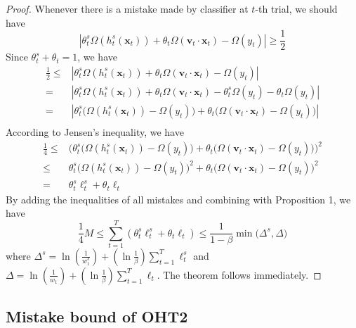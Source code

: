 \documentclass{article} %
\theoremstyle{remark}
\theoremstyle{definition}
\begin{document}
\begin{proof}
Whenever there is a mistake made by classifier at $t$-th trial, we should have 
$$ | \theta_{t}^{s} \varOmega(h_{t}^{s}(\mathbf{x}_t)) + \theta_t \varOmega(\mathbf{v}_t \cdot \mathbf{x}_t) - \varOmega(y_t) | \geq \frac{1}{2} $$
Since $\theta_{t}^{s} + \theta_t = 1$, we have
\begin{equation*}
\begin{split}
\frac{1}{2} \leq 
  & | \theta_{t}^{s} \varOmega(h_{t}^{s}(\mathbf{x}_t)) + \theta_t \varOmega(\mathbf{v}_t \cdot \mathbf{x}_t) - \varOmega(y_t) | \\
= & | \theta_{t}^{s} \varOmega(h_{t}^{s}(\mathbf{x}_t)) + \theta_t \varOmega(\mathbf{v}_t \cdot \mathbf{x}_t) - \theta_{t}^{s} \varOmega(y_t) - \theta_t \varOmega(y_t) | \\
= & | \theta_{t}^{s} \big( \varOmega(h_{t}^{s}(\mathbf{x}_t)) - \varOmega(y_t) \big) + \theta_t \big( \varOmega(\mathbf{v}_t \cdot \mathbf{x}_t) - \varOmega(y_t) \big) | \\
\end{split}
\end{equation*}
According to Jensen's inequality, we have
\begin{equation*}
\begin{split}
\frac{1}{4} 
\leq & \Big( \theta_{t}^{s} \big( \varOmega(h_{t}^{s}(\mathbf{x}_t)) - \varOmega(y_t) \big) + \theta_t \big( \varOmega(\mathbf{v}_t \cdot \mathbf{x}_t) - \varOmega(y_t) \big) \Big) ^ 2 \\
\leq & \theta_{t}^{s} \Big( \varOmega(h_{t}^{s}(\mathbf{x}_t)) - \varOmega(y_t) \Big) ^ 2 + \theta_t \Big( \varOmega(\mathbf{v}_t \cdot \mathbf{x}_t) - \varOmega(y_t) \Big) ^ 2 \\
   = & \theta_{t}^{s} \ell_{t}^{s} + \theta_t \ell_t 
\end{split}
\end{equation*}
By adding the inequalities of all mistakes and combining with Proposition 1, we have
$$ \frac{1}{4}M \leq \sum\limits_{t=1}^{T} ( \theta_{t}^{s} \ell_{t}^{s} + \theta_t \ell_t ) \leq \frac{1}{1-\beta} \min \big( \varDelta^s, \varDelta \big) $$
where
$ \varDelta^s = \ln(\frac{1}{w_{1}^{s}}) + (\ln \frac{1}{\beta}) \sum\limits_{t=1}^{T} \ell_{t}^{s} $ and $ \varDelta = \ln(\frac{1}{w_{1}}) + (\ln \frac{1}{\beta}) \sum\limits_{t=1}^{T} \ell_{t} $.
The theorem follows immediately.
\end{proof}

\subsection{Mistake bound of OHT2}
\end{document}
